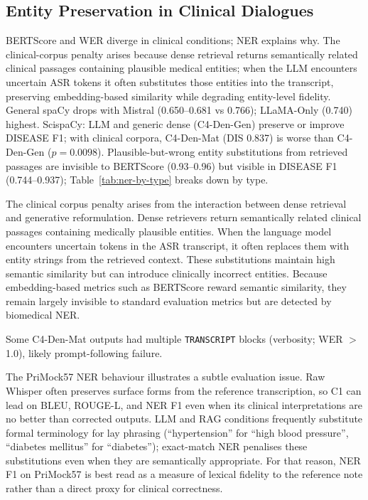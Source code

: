 \documentclass[11pt,a4paper,twocolumn]{article}
\begin{document}
\subsection{Entity Preservation in Clinical Dialogues}
\label{sec:entity}\label{sec:verbosity}

BERTScore and WER diverge in clinical conditions; NER explains why. The
clinical-corpus penalty arises because dense retrieval returns semantically
related clinical passages containing plausible medical entities; when the LLM
encounters uncertain ASR tokens it often substitutes those entities into the
transcript, preserving embedding-based similarity while degrading entity-level
fidelity. General spaCy drops with Mistral (0.650--0.681 vs 0.766);
LLaMA-Only (0.740) highest. ScispaCy: LLM and generic dense (C4-Den-Gen)
preserve or improve DISEASE F1; with clinical corpora, C4-Den-Mat
(DIS 0.837) is worse than C4-Den-Gen ($p = 0.0098$). Plausible-but-wrong
entity substitutions from retrieved passages are invisible to BERTScore
(0.93--0.96) but visible in DISEASE F1 (0.744--0.937);
Table~\ref{tab:ner-by-type} breaks down by type.

The clinical corpus penalty arises from the interaction between dense
retrieval and generative reformulation. Dense retrievers return
semantically related clinical passages containing medically plausible
entities. When the language model encounters uncertain tokens in the ASR
transcript, it often replaces them with entity strings from the retrieved
context. These substitutions maintain high semantic similarity but can
introduce clinically incorrect entities. Because embedding-based metrics
such as BERTScore reward semantic similarity, they remain largely invisible
to standard evaluation metrics but are detected by biomedical NER.

Some C4-Den-Mat outputs had multiple \texttt{TRANSCRIPT} blocks (verbosity; WER
$>$ 1.0), likely prompt-following failure.

The PriMock57 NER behaviour illustrates a subtle evaluation issue. Raw Whisper
often preserves surface forms from the reference transcription, so C1 can lead
on BLEU, ROUGE-L, and NER F1 even when its clinical interpretations are no
better than corrected outputs. LLM and RAG conditions frequently substitute
formal terminology for lay phrasing (``hypertension'' for ``high blood
pressure'', ``diabetes mellitus'' for ``diabetes''); exact-match NER penalises
these substitutions even when they are semantically appropriate. For that
reason, NER F1 on PriMock57 is best read as a measure of lexical fidelity to
the reference note rather than a direct proxy for clinical correctness.
\end{document}
